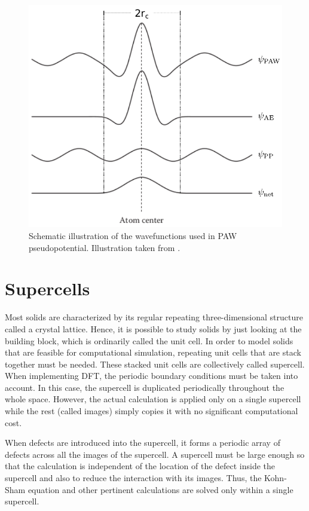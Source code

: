 \begin{figure}[tbh!]
	\centering
	\includegraphics[width=0.48\linewidth]{"images/computational/PAW"}
	\caption[ Schematic illustration of the wavefunctions used in PAW pseudopotential]{Schematic illustration of the wavefunctions used in PAW pseudopotential. Illustration taken from \citep{Lee2016}.}
	\label{fig:PAW}
\end{figure}

\section{Supercells}
Most solids are characterized by its regular repeating three-dimensional structure called a crystal lattice. Hence, it is possible to study solids by just looking at the building block, which is ordinarily called the unit cell. In order to model solids that are feasible for computational simulation, repeating unit cells that are stack together must be needed. These  stacked unit cells  are collectively called supercell. When implementing DFT, the periodic boundary conditions must be taken into account. In this case, the supercell is duplicated periodically throughout the whole space. However, the actual calculation is applied only on a single supercell while the rest (called images) simply copies it with no significant computational cost.

When defects are introduced into the supercell, it forms a periodic array of defects across all the images of the supercell. A supercell must be large enough so that the calculation is independent of the location of the defect inside the supercell and also to reduce  the interaction  with its images. Thus, the Kohn-Sham equation and other pertinent calculations are solved only within  a single supercell.


